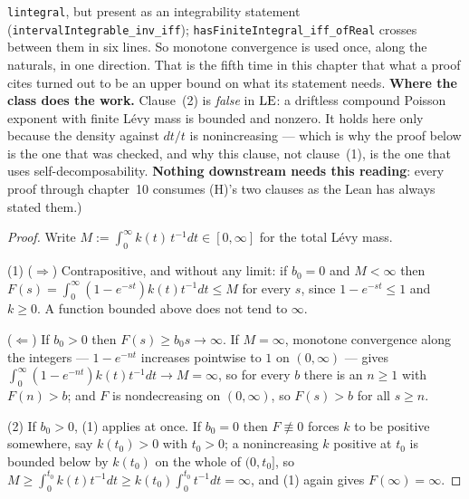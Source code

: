 \begin{lemma}
{\texttt{lintegral}, but present as an integrability statement
(\texttt{intervalIntegrable\_inv\_iff}); \texttt{hasFiniteIntegral\_iff\_ofReal} crosses between
them in six lines. So monotone convergence is used once, along the naturals, in one direction.
That is the fifth time in this chapter that what a proof cites turned out to be an upper bound on
what its statement needs.
\textbf{Where the class does the work.} Clause~(2) is \emph{false} in $\mathrm{LE}$: a driftless compound
Poisson exponent with finite Lévy mass is bounded and nonzero. It holds here only because the
density against $dt/t$ is nonincreasing --- which is why the proof below is the one that was
checked, and why this clause, not clause~(1), is the one that uses self-decomposability.
\textbf{Nothing downstream needs this reading}: every proof through chapter~10 consumes (H)'s two
clauses as the Lean has always stated them.)}
\end{lemma}

\begin{proof}
\leanok
Write $M := \int_0^\infty k(t)\,t^{-1}dt \in [0,\infty]$ for the total Lévy mass.

(1) ($\Rightarrow$) Contrapositive, and without any limit: if $b_0 = 0$ and $M < \infty$ then
$F(s) = \int_0^\infty (1 - e^{-st})k(t)t^{-1}dt \le M$ for every $s$, since
$1 - e^{-st} \le 1$ and $k \ge 0$. A function bounded above does not tend to $\infty$.

($\Leftarrow$) If $b_0 > 0$ then $F(s) \ge b_0 s \to \infty$. If $M = \infty$, monotone
convergence along the integers --- $1 - e^{-nt}$ increases pointwise to $1$ on $(0,\infty)$ ---
gives $\int_0^\infty (1-e^{-nt})k(t)t^{-1}dt \to M = \infty$, so for every $b$ there is an
$n \ge 1$ with $F(n) > b$; and $F$ is nondecreasing on $(0,\infty)$, so $F(s) > b$ for all
$s \ge n$.

(2) If $b_0 > 0$, (1) applies at once. If $b_0 = 0$ then $F \not\equiv 0$ forces $k$ to be
positive somewhere, say $k(t_0) > 0$ with $t_0 > 0$; a nonincreasing $k$ positive at $t_0$ is
bounded below by $k(t_0)$ on the whole of $(0,t_0]$, so
$M \ge \int_0^{t_0}k(t)t^{-1}dt \ge k(t_0)\int_0^{t_0}t^{-1}dt = \infty$, and (1) again gives
$F(\infty) = \infty$.
\end{proof}

